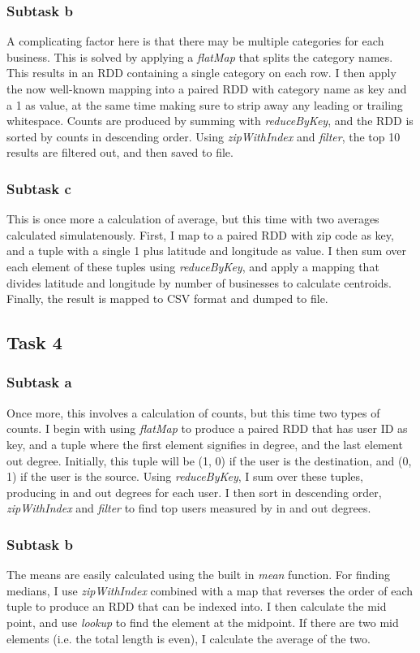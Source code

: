 \documentclass[a4paper]{article}
\begin{document}
\subsubsection{Subtask b}
A complicating factor here is that there may be multiple categories for each business. This is solved by applying a \emph{flatMap} that splits the category names. This results in an RDD containing a single category on each row. I then apply the now well-known mapping into a paired RDD with category name as key and a 1 as value, at the same time making sure to strip away any leading or trailing whitespace. Counts are produced by summing with \emph{reduceByKey}, and the RDD is sorted by counts in descending order. Using \emph{zipWithIndex} and \emph{filter}, the top 10 results are filtered out, and then saved to file.

\subsubsection{Subtask c}
This is once more a calculation of average, but this time with two averages calculated simulatenously. First, I map to a paired RDD with zip code as key, and a tuple with a single 1 plus latitude and longitude as value. I then sum over each element of these tuples using \emph{reduceByKey}, and apply a mapping that divides latitude and longitude by number of businesses to calculate centroids. Finally, the result is mapped to CSV format and dumped to file.


\subsection{Task 4}

\subsubsection{Subtask a}
Once more, this involves a calculation of counts, but this time two types of counts. I begin with using \emph{flatMap} to produce a paired RDD that has user ID as key, and a tuple where the first element signifies in degree, and the last element out degree. Initially, this tuple will be (1, 0) if the user is the destination, and (0, 1) if the user is the source. Using \emph{reduceByKey}, I sum over these tuples, producing in and out degrees for each user. I then sort in descending order, \emph{zipWithIndex} and \emph{filter} to find top users measured by in and out degrees. 

\subsubsection{Subtask b}
The means are easily calculated using the built in \emph{mean} function. For finding medians, I use \emph{zipWithIndex} combined with a map that reverses the order of each tuple to produce an RDD that can be indexed into. I then calculate the mid point, and use \emph{lookup} to find the element at the midpoint. If there are two mid elements (i.e. the total length is even), I calculate the average of the two.
\end{document}
